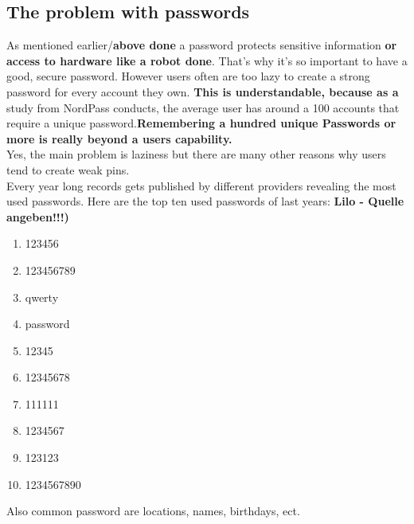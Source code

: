 \documentclass[conference]{IEEEtran}
\begin{document}
\subsection{The problem with passwords}
As mentioned earlier/\textbf{above done} a password protects sensitive information \textbf{or access to hardware like a robot done}. That's why it's so important to have a good, secure password. However users often are too lazy to create a strong password for every account they own. \textbf{This is understandable, because as a} study from NordPass conducts, the average user has around a 100 accounts that require a unique password.\textbf{Remembering a hundred unique Passwords or more is really beyond a users capability.}\\
Yes, the main problem is laziness but there are many other reasons why users tend to create weak pins.\\
Every year long records gets published by different providers revealing the most used passwords. Here are the top ten used passwords of last years:
\textbf{Lilo - Quelle angeben!!!)}
\vspace{0.5cm}
\begin{enumerate}
\item 123456
\item 123456789
\item qwerty
\item password
\item 12345
\item 12345678
\item 111111
\item 1234567
\item 123123
\item 1234567890
\end{enumerate}

Also common password are locations, names, birthdays, ect.
\end{document}
